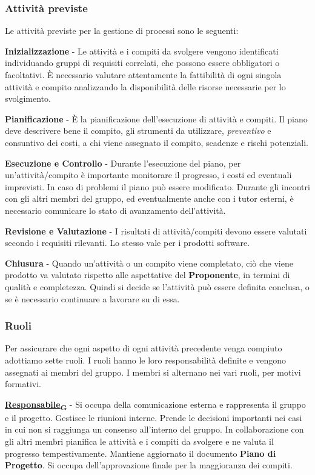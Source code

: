 \documentclass[12pt, a4paper]{article}
\newcommand{\urlglossario}{https://skynetunigroup.github.io/Code_Guardian/Documentazione/PB/glossario_v2.0.0.pdf} %
\newcommand{\glo}[2]{\href{\urlglossario\#nameddest=#2}{#1\textsubscript{G}}}
\begin{document}
\subsubsection{Attività previste}

Le attività previste per la gestione di processi sono le seguenti:

\textbf{Inizializzazione} - Le attività e i compiti da svolgere vengono identificati individuando gruppi di requisiti correlati, che possono essere obbligatori o facoltativi. È necessario valutare attentamente la fattibilità di ogni singola attività e compito analizzando la disponibilità delle risorse necessarie per lo svolgimento.

 \textbf{Pianificazione} - È la pianificazione dell'esecuzione di attività e compiti. Il piano deve descrivere bene il compito, gli strumenti da utilizzare, \textit{preventivo} e consuntivo dei costi, a chi viene assegnato il compito, scadenze e rischi potenziali.
 
 \textbf{Esecuzione e Controllo} - Durante l'esecuzione del piano, per un'attività/compito è importante monitorare il progresso, i costi ed eventuali imprevisti. In caso di problemi il piano può essere modificato. Durante gli incontri con gli altri membri del gruppo, ed eventualmente anche con i tutor esterni, è necessario comunicare lo stato di avanzamento dell'attività.
 
 \textbf{Revisione e Valutazione} - I risultati di attività/compiti devono essere valutati secondo i requisiti rilevanti. Lo stesso vale per i prodotti software.
 
 \textbf{Chiusura} - Quando un'attività o un compito viene completato, ciò che viene prodotto va valutato rispetto alle aspettative del \textbf{Proponente}, in termini di qualità e completezza. Quindi si decide se l'attività può essere definita conclusa, o se è necessario continuare a lavorare su di essa.

\subsubsection{Ruoli}

Per assicurare che ogni aspetto di ogni attività precedente venga compiuto adottiamo sette ruoli. I ruoli hanno le loro responsabilità definite e vengono assegnati ai membri del gruppo. I membri si alternano nei vari ruoli, per motivi formativi.

\textbf{\glo{Responsabile}{responsabile}} - Si occupa della comunicazione esterna e rappresenta il gruppo e il progetto. Gestisce le riunioni interne. Prende le decisioni importanti nei casi in cui non si raggiunga un consenso all'interno del gruppo. In collaborazione con gli altri membri pianifica le attività e i compiti da svolgere e ne valuta il progresso tempestivamente. Mantiene aggiornato il documento \textbf{Piano di Progetto}. Si occupa dell'approvazione finale per la maggioranza dei compiti.
\end{document}
